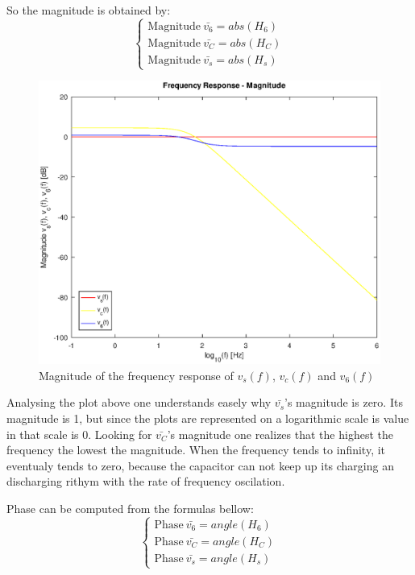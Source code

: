 So the magnitude is obtained by:
$$
\begin{cases}
  \text{Magnitude}\: \bar{v_{6}} = abs(H_{6})\\
  \text{Magnitude}\: \bar{v_{C}} = abs(H_{C})\\
  \text{Magnitude}\: \bar{v_{s}} = abs(H_{s})  
\end{cases}
$$
\begin{figure}[H] \centering
\includegraphics[width=0.8\linewidth]{freq_db.eps}
\caption{Magnitude of the frequency response of $v_s(f)$, $v_c(f)$ and $v_6(f)$}
\label{fig:magnitude_theo}
\end{figure}

Analysing the plot above one understands easely why $\bar{v_s}$'s magnitude is zero. Its magnitude is 1, but since the plots are represented on a logarithmic scale is value in that scale is 0.
Looking for $\bar{v_C}$'s magnitude one realizes that the highest the frequency the lowest the magnitude. When the frequency tends to infinity, it eventualy tends to zero, because the capacitor can not keep up its charging an discharging rithym with the rate of frequency oscilation.

Phase can be computed from the formulas bellow:
$$
\begin{cases}
  \text{Phase}\: \bar{v_{6}} = angle(H_{6})\\
  \text{Phase}\: \bar{v_{C}} = angle(H_{C})\\
  \text{Phase}\: \bar{v_{s}} = angle(H_{s})
\end{cases}
$$

